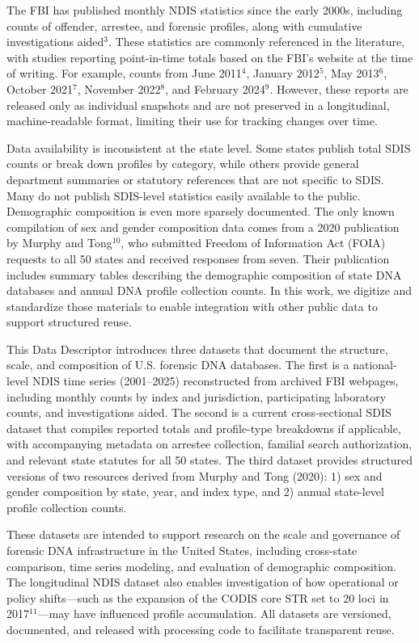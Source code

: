 \documentclass[11pt]{article}
\begin{document}
The FBI has published monthly NDIS statistics since the early 2000s, including counts of offender, arrestee, and forensic profiles, along with cumulative investigations aided$^{3}$. These statistics are commonly referenced in the literature, with studies reporting point-in-time totals based on the FBI's website at the time of writing. For example, counts from June 2011$^{4}$, January 2012$^{5}$, May 2013$^{6}$, October 2021$^{7}$, November 2022$^{8}$, and February 2024$^{9}$. However, these reports are released only as individual snapshots and are not preserved in a longitudinal, machine-readable format, limiting their use for tracking changes over time.

Data availability is inconsistent at the state level. Some states publish total SDIS counts or break down profiles by category, while others provide general department summaries or statutory references that are not specific to SDIS. Many do not publish SDIS-level statistics easily available to the public. Demographic composition is even more sparsely documented. The only known compilation of sex and gender composition data comes from a 2020 publication by Murphy and Tong$^{10}$, who submitted Freedom of Information Act (FOIA) requests to all 50 states and received responses from seven. Their publication includes summary tables describing the demographic composition of state DNA databases and annual DNA profile collection counts. In this work, we digitize and standardize those materials to enable integration with other public data to support structured reuse.

This Data Descriptor introduces three datasets that document the structure, scale, and composition of U.S. forensic DNA databases. The first is a national-level NDIS time series (2001--2025) reconstructed from archived FBI webpages, including monthly counts by index and jurisdiction, participating laboratory counts, and investigations aided. The second is a current cross-sectional SDIS dataset that compiles reported totals and profile-type breakdowns if applicable, with accompanying metadata on arrestee collection, familial search authorization, and relevant state statutes for all 50 states. The third dataset provides structured versions of two resources derived from Murphy and Tong (2020): 1) sex and gender composition by state, year, and index type, and 2) annual state-level profile collection counts.

These datasets are intended to support research on the scale and governance of forensic DNA infrastructure in the United States, including cross-state comparison, time series modeling, and evaluation of demographic composition. The longitudinal NDIS dataset also enables investigation of how operational or policy shifts---such as the expansion of the CODIS core STR set to 20 loci in 2017$^{11}$---may have influenced profile accumulation. All datasets are versioned, documented, and released with processing code to facilitate transparent reuse.
\end{document}
